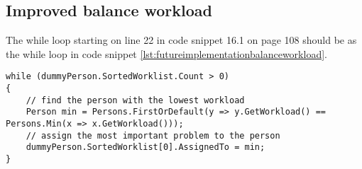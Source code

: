 \subsection*{Improved balance workload}
The while loop starting on line 22 in code snippet 16.1 on page 108 should be as the while loop in code snippet \ref{lst:futureimplementationbalanceworkload}.
\begin{lstlisting}[style=sourceCode, caption=\myCaption{Corrected worklist}, label=lst:futureimplementationbalanceworkload]
while (dummyPerson.SortedWorklist.Count > 0)
{
	// find the person with the lowest workload
	Person min = Persons.FirstOrDefault(y => y.GetWorkload() == Persons.Min(x => x.GetWorkload()));
	// assign the most important problem to the person
	dummyPerson.SortedWorklist[0].AssignedTo = min;
}
\end{lstlisting}